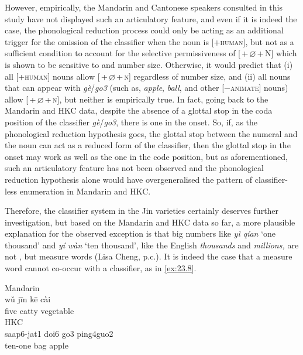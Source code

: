 \documentclass[output=paper]{langsci/langscibook}
\begin{document}
However, empirically, the Mandarin and Cantonese
speakers consulted in this study have not displayed such an articulatory
feature, and even if it is indeed the case, the phonological reduction process
could only be acting as an additional trigger for the omission of the
classifier when the noun is [+\textsc{human}], but not as a sufficient
condition to account for the selective permissiveness of [\Num{}\,+\,$\varnothing$\,+\,N] 
which is shown to be sensitive to  and number
size. Otherwise, it would predict that (i) all [+\textsc{human}] nouns allow
[\Num{}\,+\,$\varnothing$\,+\,\textsc{n}] regardless of number size, and (ii) all
nouns that can appear with \emph{gè}/\emph{go3} (such as, \emph{apple},
\emph{ball}, and other [$-$\textsc{animate}] nouns) allow [\Num{}\,+\,$\varnothing$\,+\,\textsc{n}], 
but neither is empirically true. In fact,
going back to the Mandarin and \gls{HKC} data, despite the absence of a glottal
stop in the coda position of the classifier \emph{gè}/\emph{go3}, there is one
in the onset. So, if, as the phonological reduction hypothesis goes, the
glottal stop between the numeral and the noun can act as a reduced form of the
classifier, then the glottal stop in the onset may work as well as the one in
the code position, but as aforementioned, such an articulatory feature has not
been observed and the phonological reduction hypothesis alone would have
overgeneralised the pattern of classifier-less enumeration in Mandarin and
\gls{HKC}.

Therefore, the classifier system in the Jin varieties certainly deserves
further investigation, but based on the Mandarin and \gls{HKC} data so far, a
more plausible explanation for the observed exception is that big numbers like
\emph{yì qían} ‘one thousand’ and \emph{yí wàn} ‘ten thousand’, like the
English \emph{thousands} and \emph{millions,} are not , but
measure words (Lisa Cheng, p.c.). It is indeed the case that a measure word
cannot co-occur with a classifier, as in \eqref{ex:23.8}.

\ea\label{ex:23.8} %
	\ea Mandarin\\
    \gll * wǔ jīn kē cài\\
		{} five catty \Clf{} vegetable\\
    \ex \gls{HKC}\\%
	\gll * saap6-jat1 doi6 go3 ping4guo2\\
		{} ten-one bag \Clf{} apple\\
	\z
\z
\end{document}

